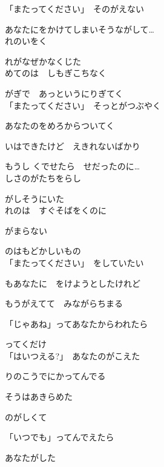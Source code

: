 「またってください」　そのがえない

あなたにをかけてしまいそうながして…
\\

れのいをく

れがなぜかなくじた
\\

めてのは　しもぎこちなく

がぎで　あっというにりぎてく
\\

「またってください」　そっとがつぶやく

あなたのをめろからついてく

いはできたけど　えきれないばかり

もうし くでせたら　せだったのに…
\\

しさのがたちをらし

がしそうにいた
\\

れのは　すぐそばをくのに

がまらない

のはもどかしいもの
\\

「またってください」　をしていたい

もあなたに　をけようとしたけれど

もうがえてて　みながらちまる

「じゃあね」ってあなたからわれたら

ってくだけ
\\

「はいつえる?」　あなたのがこえた

りのこうでにかってんでる

そうはあきらめた

のがしくて

「いつでも」ってんでえたら

あなたがした
\\
